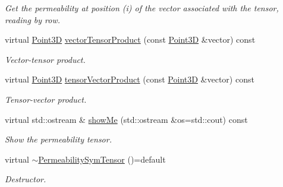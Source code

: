 \begin{DoxyCompactItemize}
\begin{DoxyCompactList}\small\item\em Get the permeability at position (i) of the vector associated with the tensor, reading by row. \end{DoxyCompactList}\item 
virtual \hyperlink{classFVCode3D_1_1Point3D}{Point3D} \hyperlink{classFVCode3D_1_1PermeabilitySymTensor_a98f843b5517b262ce5dc224a53607862}{vector\+Tensor\+Product} (const \hyperlink{classFVCode3D_1_1Point3D}{Point3D} \&vector) const 
\begin{DoxyCompactList}\small\item\em Vector-\/tensor product. \end{DoxyCompactList}\item 
virtual \hyperlink{classFVCode3D_1_1Point3D}{Point3D} \hyperlink{classFVCode3D_1_1PermeabilitySymTensor_a8b147bf9e57927899dd92dff4980d1e8}{tensor\+Vector\+Product} (const \hyperlink{classFVCode3D_1_1Point3D}{Point3D} \&vector) const 
\begin{DoxyCompactList}\small\item\em Tensor-\/vector product. \end{DoxyCompactList}\item 
virtual std\+::ostream \& \hyperlink{classFVCode3D_1_1PermeabilitySymTensor_a72332071c0bd6bb2ccdde36ca0b493a2}{show\+Me} (std\+::ostream \&os=std\+::cout) const 
\begin{DoxyCompactList}\small\item\em Show the permeability tensor. \end{DoxyCompactList}\item 
virtual \hyperlink{classFVCode3D_1_1PermeabilitySymTensor_a75bb7e9d9439c5ccde7b5eff31648dc6}{$\sim$\+Permeability\+Sym\+Tensor} ()=default
\begin{DoxyCompactList}\small\item\em Destructor. \end{DoxyCompactList}\end{DoxyCompactItemize}
